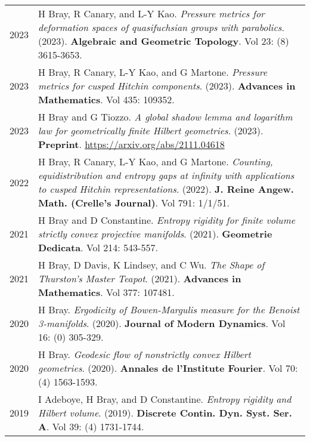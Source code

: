 
    \medskip


    \medskip
    
    \begin{center}
    {
    \renewcommand{\arraystretch}{1.5}
    \begin{longtable}{p{}  p{}}
    
2023 & 
        H Bray, R Canary, and L-Y Kao. \textit{Pressure metrics for deformation spaces of quasifuchsian groups with parabolics}. (2023). 
        \textbf{Algebraic and Geometric Topology}. Vol 23: (8) 3615-3653.\\ 

2023 & 
        H Bray, R Canary, L-Y Kao, and G Martone. \textit{Pressure metrics for cusped Hitchin components}. (2023). 
        \textbf{Advances in Mathematics}. Vol 435: 109352.\\ 

2023 & 
        H Bray and G Tiozzo. \textit{A global shadow lemma and logarithm law for geometrically finite Hilbert geometries}. (2023). 
         \textbf{Preprint}. \url{https://arxiv.org/abs/2111.04618}\\ 

2022 & 
        H Bray, R Canary, L-Y Kao, and G Martone. \textit{Counting, equidistribution and entropy gaps at infinity with applications to cusped Hitchin representations}. (2022). 
        \textbf{J. Reine Angew. Math. (Crelle's Journal)}. Vol 791: 1/1/51.\\ 

2021 & 
        H Bray and D Constantine. \textit{Entropy rigidity for finite volume strictly convex projective manifolds}. (2021). 
        \textbf{Geometrie Dedicata}. Vol 214: 543-557.\\ 

2021 & 
        H Bray, D Davis, K Lindsey, and C Wu. \textit{The Shape of Thurston's Master Teapot}. (2021). 
        \textbf{Advances in Mathematics}. Vol 377: 107481.\\ 

2020 & 
        H Bray. \textit{Ergodicity of Bowen-Margulis measure for the Benoist 3-manifolds}. (2020). 
        \textbf{Journal of Modern Dynamics}. Vol 16: (0) 305-329.\\ 

2020 & 
        H Bray. \textit{Geodesic flow of nonstrictly convex Hilbert geometries}. (2020). 
        \textbf{Annales de l'Institute Fourier}. Vol 70: (4) 1563-1593.\\ 

2019 & 
        I Adeboye, H Bray, and D Constantine. \textit{Entropy rigidity and Hilbert volume}. (2019). 
        \textbf{Discrete Contin. Dyn. Syst. Ser. A}. Vol 39: (4) 1731-1744.
    \end{longtable}
    } 
    \end{center}

    \vspace{-1em}
    